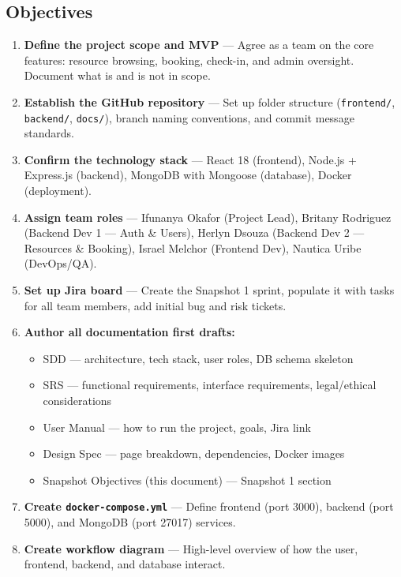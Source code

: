 \documentclass[12pt]{article}
\begin{document}
\subsection{Objectives}
\begin{enumerate}
    \item \textbf{Define the project scope and MVP} --- Agree as a team on the core features: resource browsing, booking, check-in, and admin oversight. Document what is and is not in scope.
    \item \textbf{Establish the GitHub repository} --- Set up folder structure (\texttt{frontend/}, \texttt{backend/}, \texttt{docs/}), branch naming conventions, and commit message standards.
    \item \textbf{Confirm the technology stack} --- React 18 (frontend), Node.js + Express.js (backend), MongoDB with Mongoose (database), Docker (deployment).
    \item \textbf{Assign team roles} --- Ifunanya Okafor (Project Lead), Britany Rodriguez (Backend Dev 1 --- Auth \& Users), Herlyn Dsouza (Backend Dev 2 --- Resources \& Booking), Israel Melchor (Frontend Dev), Nautica Uribe (DevOps/QA).
    \item \textbf{Set up Jira board} --- Create the Snapshot 1 sprint, populate it with tasks for all team members, add initial bug and risk tickets.
    \item \textbf{Author all documentation first drafts:}
        \begin{itemize}
            \item SDD --- architecture, tech stack, user roles, DB schema skeleton
            \item SRS --- functional requirements, interface requirements, legal/ethical considerations
            \item User Manual --- how to run the project, goals, Jira link
            \item Design Spec --- page breakdown, dependencies, Docker images
            \item Snapshot Objectives (this document) --- Snapshot 1 section
        \end{itemize}
    \item \textbf{Create \texttt{docker-compose.yml}} --- Define frontend (port 3000), backend (port 5000), and MongoDB (port 27017) services.
    \item \textbf{Create workflow diagram} --- High-level overview of how the user, frontend, backend, and database interact.
\end{enumerate}
\end{document}
